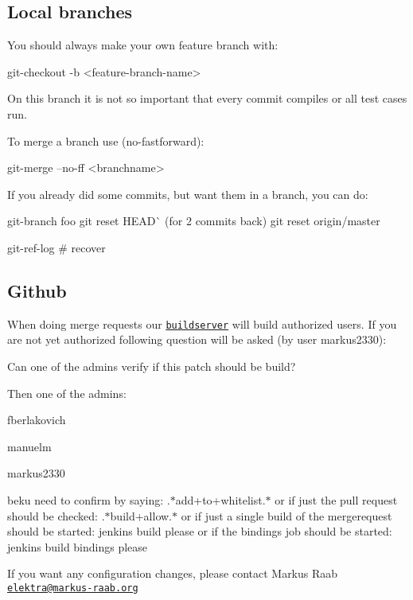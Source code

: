 \subsection*{Local branches}

You should always make your own feature branch with\+: \begin{DoxyVerb}    git-checkout -b <feature-branch-name>
\end{DoxyVerb}


On this branch it is not so important that every commit compiles or all test cases run.

To merge a branch use (no-\/fastforward)\+: \begin{DoxyVerb}    git-merge --no-ff <branchname>
\end{DoxyVerb}


If you already did some commits, but want them in a branch, you can do\+: \begin{DoxyVerb}    git-branch foo  
    git reset HEAD^^  (for 2 commits back)  
    git reset origin/master  

    git-ref-log # recover
\end{DoxyVerb}


\subsection*{Github}

When doing merge requests our \href{http://build.libelektra.org:8080}{\tt buildserver} will build authorized users. If you are not yet authorized following question will be asked (by user markus2330)\+: \begin{DoxyVerb}    Can one of the admins verify if this patch should be build?
\end{DoxyVerb}


Then one of the admins\+:
\begin{DoxyItemize}
\item fberlakovich
\item manuelm
\item markus2330
\item beku need to confirm by saying\+: .$\ast$add+to+whitelist.$\ast$ or if just the pull request should be checked\+: .$\ast$build+allow.$\ast$ or if just a single build of the mergerequest should be started\+: jenkins build please or if the bindings job should be started\+: jenkins build bindings please
\end{DoxyItemize}

If you want any configuration changes, please contact Markus Raab \href{mailto:elektra@markus-raab.org}{\tt elektra@markus-\/raab.\+org} 